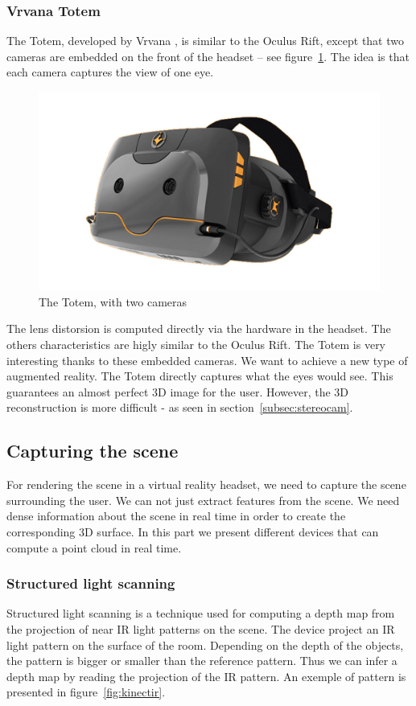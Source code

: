 \documentclass[12pt]{article}
\begin{document}
\subsubsection{Vrvana Totem}
The Totem, developed by Vrvana \cite{Vrvana}, is similar to the Oculus Rift, except that two cameras are embedded on the front of the headset -- see figure~\ref{fig:tpg}. The idea is that each camera captures the view of one eye.

\begin{figure}[h]
  \centering
  \includegraphics[scale=0.3]{TruePlayerGear.jpg}
  \caption{\label{fig:tpg} The Totem, with two cameras}
\end{figure}

The lens distorsion is computed directly via the hardware in the headset. The others characteristics are higly similar to the Oculus Rift. The Totem is very interesting thanks to these embedded cameras. We want to achieve a new type of augmented reality. The Totem directly captures what the eyes would see. This guarantees an almost perfect 3D image for the user. However, the 3D reconstruction is more difficult - as seen in section~\ref{subsec:stereocam}.

\subsection{Capturing the scene}
For rendering the scene in a virtual reality headset, we need to capture the scene surrounding the user. We can not just extract features from the scene. We need dense information about the scene in real time in order to create the corresponding 3D surface. In this part we present different devices that can compute a point cloud in real time.

\subsubsection{Structured light scanning}
Structured light scanning is a technique used for computing a depth map from the projection of near IR light patterns on the scene. The device project an IR light pattern on the surface of the room. Depending on the depth of the objects, the pattern is bigger or smaller than the reference pattern. Thus we can infer a depth map by reading the projection of the IR pattern. An exemple of pattern is presented in figure~\ref{fig:kinectir}.
\end{document}
